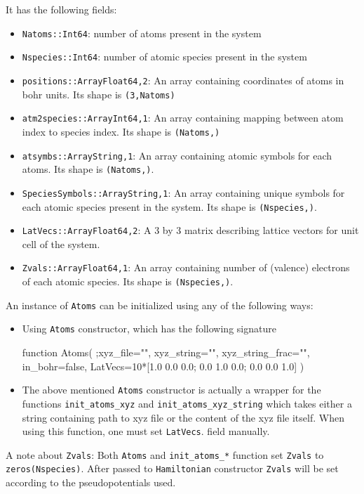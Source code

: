 \documentclass[a4paper,10pt]{paper}
\newcommand{\jlcode}[1]{\texttt{#1}}
\begin{document}
It has the following fields:
\begin{itemize}
%
\item \jlcode{Natoms::Int64}: number of atoms present in the system
%
\item \jlcode{Nspecies::Int64}: number of atomic species present in the system
%
\item \jlcode{positions::Array{Float64,2}}: An array containing coordinates of atoms
  in bohr units. Its shape is \jlcode{(3,Natoms)}
%
\item \jlcode{atm2species::Array{Int64,1}}: An array containing mapping between atom index
  to species index. Its shape is \jlcode{(Natoms,)}
%
\item \jlcode{atsymbs::Array{String,1}}: An array containing atomic symbols for each atoms.
  Its shape is \jlcode{(Natoms,)}.
%
\item \jlcode{SpeciesSymbols::Array{String,1}}: An array containing unique symbols
  for each atomic species present in the system. Its shape is \jlcode{(Nspecies,)}.
%
\item \jlcode{LatVecs::Array{Float64,2}}: A 3 by 3 matrix describing lattice vectors for unit
  cell of the system.
%
\item \jlcode{Zvals::Array{Float64,1}}: An array containing number of (valence)
  electrons of each atomic species. Its shape is \verb|(Nspecies,)|.
\end{itemize}

An instance of \jlcode{Atoms} can be initialized using any of the following ways:

\begin{itemize}
\item Using \jlcode{Atoms} constructor, which has the following signature
%
\begin{juliacode}
function Atoms( ;xyz_file="", xyz_string="", xyz_string_frac="",
                in_bohr=false,
                LatVecs=10*[1.0 0.0 0.0; 0.0 1.0 0.0; 0.0 0.0 1.0] )
\end{juliacode}
%
\item The above mentioned \jlcode{Atoms} constructor is actually a wrapper for the functions
  \jlcode{init_atoms_xyz} and \jlcode{init_atoms_xyz_string} which takes either
  a string containing path to xyz file or the content of the xyz file
  itself. When using this function, one must set \jlcode{LatVecs}.
  field manually.
\end{itemize}

A note about \jlcode{Zvals}: Both \jlcode{Atoms} and \jlcode{init_atoms_*} function set
\jlcode{Zvals} to \jlcode{zeros(Nspecies)}. After passed to \jlcode{Hamiltonian} constructor
\jlcode{Zvals} will be set according to the pseudopotentials used.
\end{document}
